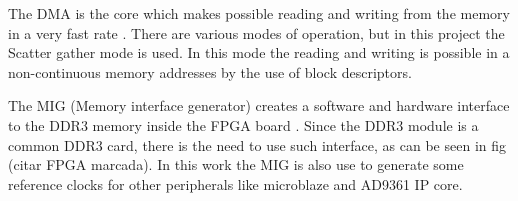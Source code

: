 





The DMA is the core which makes possible reading and writing from the memory
in a very fast rate \cite{xilinx:axidma}. There are various modes of
operation, but in this project the Scatter gather mode is used. In this mode
the reading and writing is possible in a non-continuous memory addresses by
the use of block descriptors.%



The MIG (Memory interface generator) creates a software and hardware interface
to the DDR3 memory inside the FPGA board \cite{xilinx:mig7}. Since the DDR3
module is a common DDR3 card, there is the need to use such interface, as can
be seen in fig (citar FPGA marcada). In this work the MIG is also use to
generate some reference clocks for other peripherals like microblaze and
AD9361 IP core.

